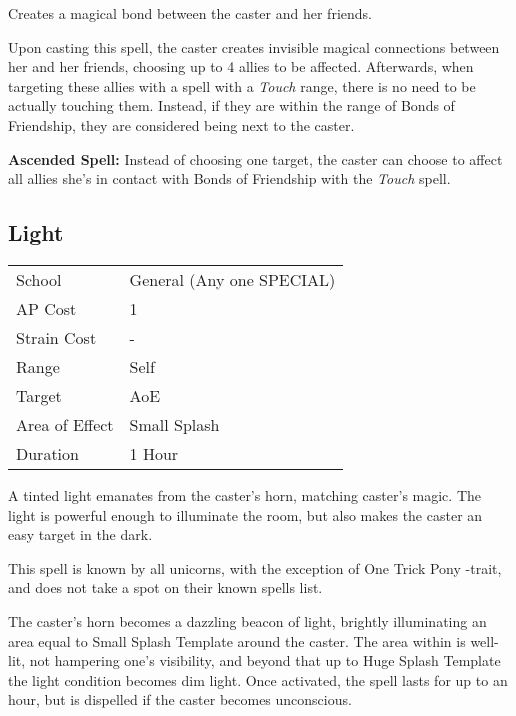 \documentclass[11pt,a4paper,twocolumn]{book}
\begin{document}
\medskip

Creates a magical bond between the caster and her friends.

Upon casting this spell, the caster creates invisible magical connections between her and her friends, choosing up to 4 allies to be affected. Afterwards, when targeting these allies with a spell with a \textit{Touch} range, there is no need to be actually touching them. Instead, if they are within the range of Bonds of Friendship, they are considered being next to the caster.

\bigskip

\textbf{Ascended Spell:} Instead of choosing one target, the caster can choose to affect all allies she's in contact with Bonds of Friendship with the \textit{Touch} spell.

\vfill

\subsection*{Light}
{
	\begin{tabu} to 75mm{| X[l,4] | X[l,7] |}
		\hline
		School 			& General (Any one SPECIAL) 		\\
		AP Cost	      	& 1 								\\
		Strain Cost     & - 								\\
		Range     		& Self 								\\
		Target      	& AoE								\\
		Area of Effect  & Small Splash  	 					\\
		Duration     	& 1 Hour							\\ \hline
	\end{tabu}
	
}

\medskip

A tinted light emanates from the caster's horn, matching caster's magic. The light is powerful enough to illuminate the room, but also makes the caster an easy target in the dark.

This spell is known by all unicorns, with the exception of One Trick Pony -trait, and does not take a spot on their known spells list.

The caster's horn becomes a dazzling beacon of light, brightly illuminating an area equal to Small Splash Template around the caster. The area within is well-lit, not hampering one's visibility, and beyond that up to Huge Splash Template the light condition becomes dim light. Once activated, the spell lasts for up to an hour, but is dispelled if the caster becomes unconscious.
\end{document}
